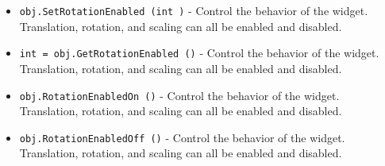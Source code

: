 \begin{itemize}
\item  \verb|obj.SetRotationEnabled (int )| -  Control the behavior of the widget. Translation, rotation, and
 scaling can all be enabled and disabled.

\item  \verb|int = obj.GetRotationEnabled ()| -  Control the behavior of the widget. Translation, rotation, and
 scaling can all be enabled and disabled.

\item  \verb|obj.RotationEnabledOn ()| -  Control the behavior of the widget. Translation, rotation, and
 scaling can all be enabled and disabled.

\item  \verb|obj.RotationEnabledOff ()| -  Control the behavior of the widget. Translation, rotation, and
 scaling can all be enabled and disabled.

\end{itemize}
